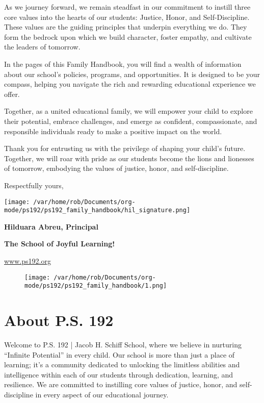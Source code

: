 \documentclass[letterpaper, 11pt]{article}
\begin{document}
As we journey forward, we remain steadfast in our commitment to instill three core values into the hearts of our students: Justice, Honor, and Self-Discipline. These values are the guiding principles that underpin everything we do. They form the bedrock upon which we build character, foster empathy, and cultivate the leaders of tomorrow.

In the pages of this Family Handbook, you will find a wealth of information about our school’s policies, programs, and opportunities. It is designed to be your compass, helping you navigate the rich and rewarding educational experience we offer.

Together, as a united educational family, we will empower your child to explore their potential, embrace challenges, and emerge as confident, compassionate, and responsible individuals ready to make a positive impact on the world.

Thank you for entrusting us with the privilege of shaping your child’s future. Together, we will roar with pride as our students become the lions and lionesses of tomorrow, embodying the values of justice, honor, and self-discipline.

Respectfully yours,

\texttt{[image: /var/home/rob/Documents/org-mode/ps192/ps192\_family\_handbook/hil\_signature.png]}

\textbf{\textbf{Hilduara Abreu, Principal}}

\textbf{\textbf{The School of Joyful Learning!}}

\href{https://www.ps192.org}{www.ps192.org}

\begin{figure}[b]  %
  \centering
  \texttt{[image: /var/home/rob/Documents/org-mode/ps192/ps192\_family\_handbook/1.png]}
  \label{fig:fronpage bottom_image}
\end{figure}

\clearpage

\section{About P.S. 192}
\label{sec:orge7c94a7}

Welcome to P.S. 192 | Jacob H. Schiff School, where we believe in nurturing ``Infinite Potential'' in every child. Our school is more than just a place of learning; it’s a community dedicated to unlocking the limitless abilities and intelligence within each of our students through dedication, learning, and resilience. We are committed to instilling core values of justice, honor, and self-discipline in every aspect of our educational journey.
\end{document}
